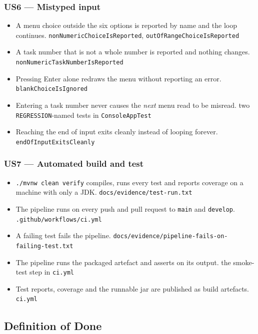 \documentclass[11pt,a4paper]{article}
\newcommand{\code}[1]{\texttt{\small #1}}
\begin{document}
\subsubsection*{US6 --- Mistyped input}
\begin{itemize}
  \item A menu choice outside the six options is reported by name and the loop
        continues. \hfill \code{nonNumericChoiceIsReported},
        \code{outOfRangeChoiceIsReported}
  \item A task number that is not a whole number is reported and nothing
        changes. \hfill \code{nonNumericTaskNumberIsReported}
  \item Pressing Enter alone redraws the menu without reporting an error.
        \hfill \code{blankChoiceIsIgnored}
  \item Entering a task number never causes the \emph{next} menu read to be
        misread. \hfill two \code{REGRESSION}-named tests in
        \code{ConsoleAppTest}
  \item Reaching the end of input exits cleanly instead of looping forever.
        \hfill \code{endOfInputExitsCleanly}
\end{itemize}

\subsubsection*{US7 --- Automated build and test}
\begin{itemize}
  \item \code{./mvnw clean verify} compiles, runs every test and reports
        coverage on a machine with only a JDK. \hfill
        \code{docs/evidence/test-run.txt}
  \item The pipeline runs on every push and pull request to \code{main} and
        \code{develop}. \hfill \code{.github/workflows/ci.yml}
  \item A failing test fails the pipeline. \hfill
        \code{docs/evidence/pipeline-fails-on-failing-test.txt}
  \item The pipeline runs the packaged artefact and asserts on its output.
        \hfill the smoke-test step in \code{ci.yml}
  \item Test reports, coverage and the runnable jar are published as build
        artefacts. \hfill \code{ci.yml}
\end{itemize}

\subsection{Definition of Done}
\end{document}
